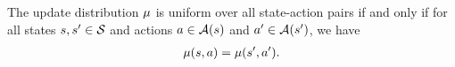 \begin{definition}
\label{asp: unbiased tsitsiklis}
The update distribution $\mu$ is uniform over all state-action pairs
if and only if
for all states $s, s' \in \mathcal{S}$ and actions $a \in \mathcal{A}(s)$ and $a' \in \mathcal{A}(s')$, we have
\begin{align}
    \nonumber
    \mu(s, a) = \mu(s', a') .
\end{align}
\end{definition}